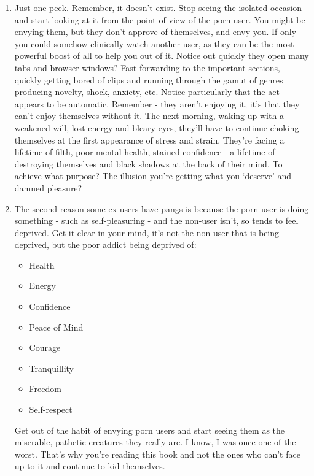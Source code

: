 \documentclass[
]{book}
\begin{document}
\begin{enumerate}
\def\labelenumi{\arabic{enumi}.}
\item
  Just one peek. Remember, it doesn't exist. Stop seeing the isolated occasion and start looking at it from the point of view of the porn user. You might be envying them, but they don't approve of themselves, and envy you. If only you could somehow clinically watch another user, as they can be the most powerful boost of all to help you out of it. Notice out quickly they open many tabs and browser windows? Fast forwarding to the important sections, quickly getting bored of clips and running through the gamut of genres producing novelty, shock, anxiety, etc. Notice particularly that the act appears to be automatic. Remember - they aren't enjoying it, it's that they can't enjoy themselves without it. The next morning, waking up with a weakened will, lost energy and bleary eyes, they'll have to continue choking themselves at the first appearance of stress and strain. They're facing a lifetime of filth, poor mental health, stained confidence - a lifetime of destroying themselves and black shadows at the back of their mind. To achieve what purpose? The illusion you're getting what you `deserve' and damned pleasure?
\item
  The second reason some ex-users have pangs is because the porn user is doing something - such as self-pleasuring - and the non-user isn't, so tends to feel deprived. Get it clear in your mind, it's not the non-user that is being deprived, but the poor addict being deprived of:

  \begin{itemize}
  \item
    Health
  \item
    Energy
  \item
    Confidence
  \item
    Peace of Mind
  \item
    Courage
  \item
    Tranquillity
  \item
    Freedom
  \item
    Self-respect
  \end{itemize}

  Get out of the habit of envying porn users and start seeing them as the miserable, pathetic creatures they really are. I know, I was once one of the worst. That's why you're reading this book and not the ones who can't face up to it and continue to kid themselves.
\end{enumerate}
\end{document}
